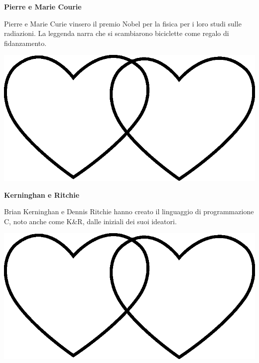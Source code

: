 \documentclass[11pt]{extarticle}
\begin{document}
\begin{center}
\vspace*{\fill}
{\Huge \textbf{Pierre e Marie Courie\\}}
\vspace*{\fill}
\end{center}
\newpage
{}
\vspace*{\fill}
\begin{center}
Pierre e Marie Curie vinsero il premio Nobel per la fisica per i loro studi sulle radiazioni. La leggenda narra che si scambiarono biciclette come regalo di fidanzamento.\\
\begin{center}
\includegraphics[scale=0.1]{img/cuori_venn.eps}\\
\end{center}
\end{center}
\vspace*{\fill}
\newpage
\begin{center}
\vspace*{\fill}
{\Huge \textbf{Kerninghan e Ritchie\\}}
\vspace*{\fill}
\end{center}
\newpage
{}
\vspace*{\fill}
\begin{center}
Brian Kerninghan e Dennis Ritchie hanno creato il linguaggio di programmazione C, noto anche come K\&R, dalle iniziali dei suoi ideatori.\\
\begin{center}
\includegraphics[scale=0.1]{img/cuori_venn.eps}\\
\end{center}
\end{center}
\end{document}
